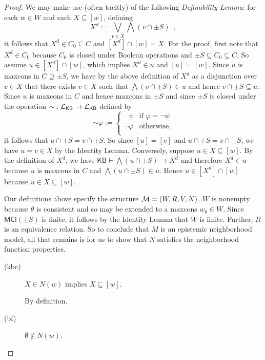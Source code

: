 \documentclass[12pt]{article}
\theoremstyle{definition}
\newcommand{\M}{{\cal M}}      %
\newcommand{\Lang}{{\cal L}}   %
\newcommand{\KB}{{\mathsf{KB}}}                 %
\newcommand{\MCl}{\mathsf{MCl}}                   %
\begin{document}
\begin{proof}
  We may make use (often tacitly) of the following \emph{Definability
    Lemma\/}: for each $w\in W$ and each $X\subseteq[w]$, defining
  \[
  \textstyle X^d :=\bigvee_{v\in X}\bigwedge(v\cap\pm S)\enspace,
  \]
  it follows that $X^d\in C_0\subseteq C$ and $[X^d]\cap[w]=X$. For
  the proof, first note that $X^d\in C_0$ because $C_0$ is closed
  under Boolean operations and $\pm S\subseteq C_0\subseteq C$.  So
  assume $u\in[X^d]\cap[w]$, which implies $X^d\in u$ and $[u]=[w]$.
  Since $u$ is maxcons in $C\supseteq\pm S$, we have by the above
  definition of $X^d$ as a disjunction over $v\in X$ that there exists
  $v\in X$ such that $\bigwedge(v\cap\pm S)\in u$ and hence
  $v\cap\pm S\subseteq u$.  Since $u$ is maxcons in $C$ and hence
  maxcons in $\pm S$ and since $\pm S$ is closed under the operation
  ${\sim}:\Lang_\KB\to\Lang_\KB$ defined by
  \[
  {\sim}\varphi :=
  \begin{cases}
    \phantom{\lnot}\psi & \text{if }\varphi=\lnot\psi\\
    \lnot\varphi & \text{otherwise,} \\
  \end{cases}
  \]
  it follows that $u\cap\pm S=v\cap\pm S$.  So since $[u]=[v]$ and
  $u\cap\pm S=v\cap\pm S$, we have $u=v\in X$ by the Identity Lemma.
  Conversely, suppose $u\in X\subseteq[w]$.  By the definition of
  $X^d$, we have $\KB\vdash\bigwedge(u\cap\pm S)\to X^d$ and therefore
  $X^d\in u$ because $u$ is maxcons in $C$ and
  $\bigwedge(u\cap\pm S)\in u$. Hence $u\in[X^d]\cap[w]$ because
  $u\in X\subseteq[w]$.

  Our definitions above specify the structure $\M=(W,R,V,N)$.  $W$ is
  nonempty because $\theta$ is consistent and so may be extended to a
  maxcons $w_\theta\in W$.  Since $\MCl(\pm S)$ is finite, it follows
  by the Identity Lemma that $W$ is finite.  Further, $R$ is an
  equivalence relation. So to conclude that $M$ is an epistemic
  neighborhood model, all that remains is for us to show that $N$
  satisfies the neighborhood function properties.
  \begin{description}
  \item[(kbc)] $X\in N(w)$ implies $X\subseteq[w]$.

    By definition.

  \item[(bf)] $\emptyset\notin N(w)$.


\end{description}
\end{proof}
\end{document}
